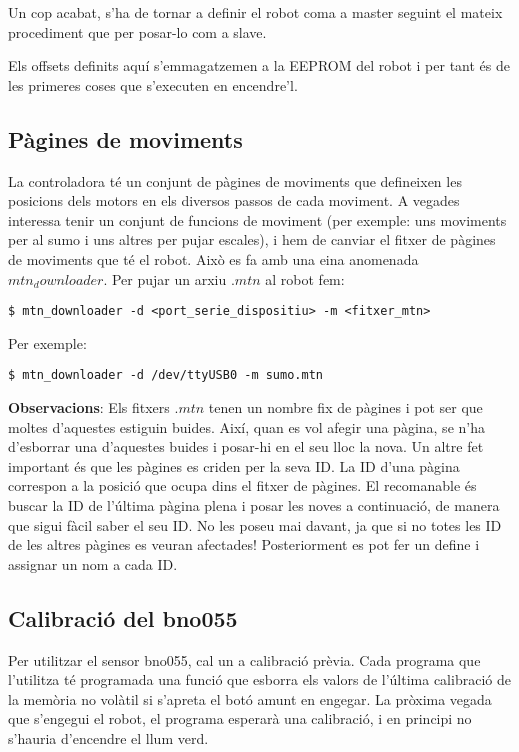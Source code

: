 \documentclass{article}
\begin{document}
Un cop acabat, s'ha de tornar a definir el robot coma a master seguint el mateix procediment que per posar-lo com a slave.

Els offsets definits aquí s'emmagatzemen a la EEPROM del robot i per tant és de les primeres coses que s'executen en encendre'l. 

\subsection{Pàgines de moviments}
La controladora té un conjunt de pàgines de moviments que defineixen les posicions dels motors en els diversos passos de cada moviment. A vegades interessa tenir un conjunt de funcions de moviment (per exemple: uns moviments per al sumo i uns altres per pujar escales), i hem de canviar el fitxer de pàgines de moviments que té el robot. Això es fa amb una eina anomenada $mtn_downloader$.
Per pujar un arxiu $.mtn$ al robot fem:

\begin{lstlisting}
$ mtn_downloader -d <port_serie_dispositiu> -m <fitxer_mtn>
\end{lstlisting}
Per exemple:

\begin{lstlisting}
$ mtn_downloader -d /dev/ttyUSB0 -m sumo.mtn
\end{lstlisting}

\textbf{Observacions}: Els fitxers $.mtn$ tenen un nombre fix de pàgines i pot ser que moltes d'aquestes estiguin buides. Així, quan es vol afegir una pàgina, se n'ha d'esborrar una d'aquestes buides i posar-hi en el seu lloc la nova. Un altre fet important és que les pàgines es criden per la seva ID. La ID d'una pàgina correspon a la posició que ocupa dins el fitxer de pàgines. El recomanable és buscar la ID de l'última pàgina plena i posar les noves a continuació, de manera que sigui fàcil saber el seu ID. No les poseu mai davant, ja que si no totes les ID de les altres pàgines es veuran afectades! Posteriorment es pot fer un define i assignar un nom a cada ID.

\subsection{Calibració del bno055}
Per utilitzar el sensor bno055, cal un a calibració prèvia. Cada programa que l'utilitza té programada una funció que esborra els valors de l'última calibració de la memòria no volàtil si s'apreta el botó amunt en engegar. La pròxima vegada que s'engegui el robot, el programa esperarà una calibració, i en principi no s'hauria d'encendre el llum verd. 
\end{document}
